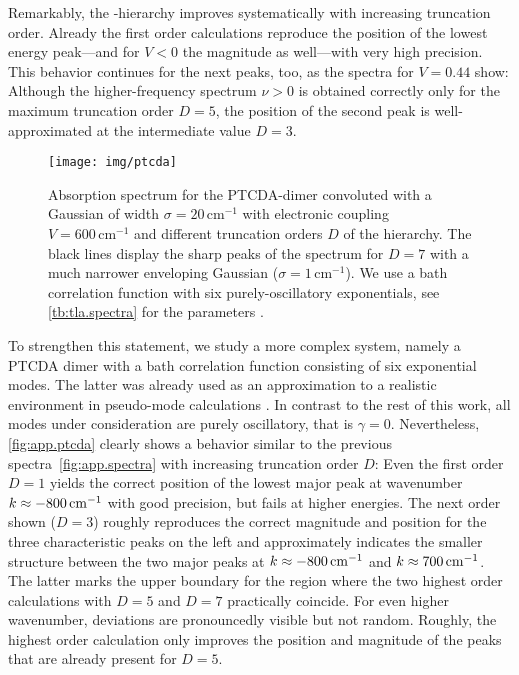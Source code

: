 Remarkably, the \NMSSE-hierarchy improves systematically with increasing truncation order.
Already the first order calculations reproduce the position of the lowest energy peak---and for $V < 0$ the magnitude as well---with very high precision.
This behavior continues for the next peaks, too, as the spectra for $V=0.44$ show:
Although the higher-frequency spectrum $\nu > 0$ is obtained correctly only for the maximum truncation order $D = 5$, the position of the second peak is well-approximated at the intermediate value $D = 3$.

\begin{figure}[t]
  \centering
  \texttt{[image: img/ptcda]}
  \caption{%
    Absorption spectrum for the \textsc{PTCDA}-dimer convoluted with a Gaussian of width $\sigma = 20\,\mathrm{cm^{-1}}$ with electronic coupling $V=600\,\mathrm{cm^{-1}}$ and different truncation orders $D$ of the hierarchy.
    The black lines display the sharp peaks of the spectrum for $D=7$ with a much narrower enveloping Gaussian ($\sigma = 1\,\mathrm{cm^{-1}}$).
    We use a bath correlation function with six purely-oscillatory exponentials, see \autoref{tb:tla.spectra} for the parameters \cite[Tab.\,1 D]{RoEiDv11_ptcda}.
  }
  \label{fig:app.ptcda}
\end{figure}

To strengthen this statement, we study a more complex system, namely a \textsc{PTCDA} dimer with a bath correlation function consisting of six exponential modes.
The latter was already used as an approximation to a realistic environment in pseudo-mode calculations \cite{RoEiDv11_ptcda}.
In contrast to the rest of this work, all modes under consideration are purely oscillatory, that is $\gamma = 0$.
Nevertheless, \autoref{fig:app.ptcda} clearly shows a behavior similar to the previous spectra~\ref{fig:app.spectra} with increasing truncation order $D$:
Even the first order $D=1$ yields the correct position of the lowest major peak at wavenumber $k \approx -800\,\mathrm{cm}^{-1}$ with good precision, but fails at higher energies.
The next order shown ($D=3$) roughly reproduces the correct magnitude and position for the three characteristic peaks on the left and approximately indicates the smaller structure between the two major peaks at $k \approx -800\,\mathrm{cm}^{-1}$ and $k \approx 700\,\mathrm{cm}^{-1}$.
The latter marks the upper boundary for the region where the two highest order calculations with $D=5$ and $D=7$ practically coincide.
For even higher wavenumber, deviations are pronouncedly visible but not random.
Roughly, the highest order calculation only improves the position and magnitude of the peaks that are already present for $D=5$.\\



